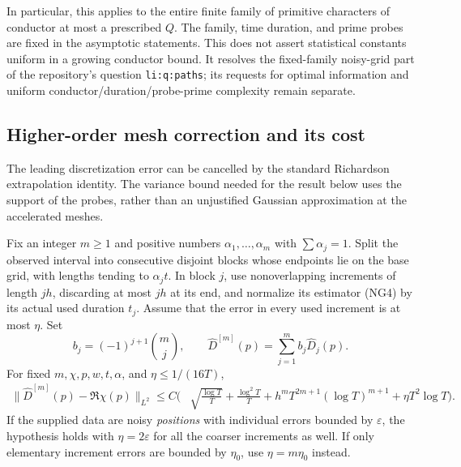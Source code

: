 In particular, this applies to the entire finite family of primitive
characters of conductor at most a prescribed $Q$.  The family, time
duration, and prime probes are fixed in the asymptotic statements.  This
does not assert statistical constants uniform in a growing conductor
bound.  It resolves the fixed-family noisy-grid part of the repository's
question \texttt{li:q:paths}; its requests for optimal information and
uniform conductor/duration/probe-prime complexity remain separate.

\subsection{Higher-order mesh correction and its cost}

The leading discretization error can be cancelled by the standard
Richardson extrapolation identity.  The variance bound needed for the
result below uses the support of the probes, rather than an unjustified
Gaussian approximation at the accelerated meshes.

\begin{theorem}
\label{thm:extrapolation}
Fix an integer $m\ge1$ and positive numbers $\alpha_1,\ldots,\alpha_m$
with $\sum\alpha_j=1$.  Split the observed interval into consecutive
disjoint blocks whose endpoints lie on the base grid, with lengths tending to $\alpha_jt$. In block $j$, use
nonoverlapping increments of length $jh$, discarding at most $jh$ at its
end, and normalize its estimator (NG4) by its actual used duration $t_j$.
Assume that the error in every used increment is at most $\eta$.
Set
\[
 b_j=(-1)^{j+1}\binom mj,\qquad
 \widehat D^{[m]}(p)=\sum_{j=1}^m b_j\widehat D_j(p).       \tag{NG25}
\]
For fixed $m,\chi,p,w,t,\alpha$, and $\eta\le1/(16T)$,
\begin{align*}
 \|\widehat D^{[m]}(p)-\Re\chi(p)\|_{L^2}
 \le C\bigg(&\sqrt{\frac{\log T}{T}}
          +\frac{\log^2T}{T}
          +h^mT^{2m+1}(\log T)^{m+1}
          +\eta T^2\log T\bigg).                         \tag{NG26}
\end{align*}
If the supplied data are noisy \emph{positions} with individual errors
bounded by $\varepsilon$, the hypothesis holds with $\eta=2\varepsilon$
for all the coarser increments as well.  If only elementary increment
errors are bounded by $\eta_0$, use $\eta=m\eta_0$ instead.
\end{theorem}

